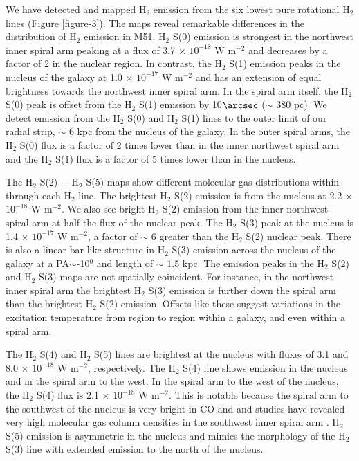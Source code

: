 \documentclass[12pt,preprint]{aastex}
\begin{document}
We have detected and mapped H$_2$ emission from the six
lowest pure rotational H$_2$ lines (Figure \ref{figure-3}).  The
maps reveal remarkable differences in the distribution of
H$_2$ emission in M51.  H$_2$ S(0) emission is
strongest in the northwest inner spiral arm peaking at a flux of 3.7
$\times$ $\mathrm{10^{-18}}$ W $\mathrm{m^{-2}}$ and decreases by a
factor of 2 in the nuclear region.  In contrast, the H$_2$
S(1) emission peaks in the nucleus of the galaxy at
1.0 $\times$ $\mathrm{10^{-17}}$ W $\mathrm{m^{-2}}$ and has an
extension of equal brightness towards the northwest inner spiral arm.  In the
spiral arm itself, the H$_2$ S(0) peak is offset from the
H$_2$ S(1) emission by 10$\arcsec$ ($\sim$ 380 pc).  
We detect emission from the H$_2$ S(0) and 
H$_2$ S(1) lines to the outer limit of our radial 
strip,  $\sim$ 6 kpc from the nucleus of the galaxy.  In the outer spiral arms,
the H$_2$ S(0) flux is a factor of 2 times lower than in
the inner northwest spiral arm and the H$_2$ S(1) flux
is a factor of 5 times lower than in the nucleus.
 
The $\mathrm{ H_2}$ S(2) $-$ H$_2$ S(5) maps show different
molecular gas distributions within  through each
H$_2$ line.  The brightest H$_2$ S(2) emission is
from the nucleus at 2.2 $\times$ $\mathrm{10^{-18}}$ W
$\mathrm{m^{-2}}$.  We also see bright H$_2$ S(2) emission
from the inner northwest spiral arm at half the flux of the
nuclear peak.  The H$_2$ S(3) peak at the nucleus is 1.4
$\times$ $\mathrm{10^{-17}}$ W $\mathrm{m^{-2}}$, a factor of $\sim$ 6
greater than the H$_2$ S(2) nuclear peak.  There is also a
linear bar-like structure in H$_2$ S(3) emission across the
nucleus of the galaxy at a PA$\sim$-10$^0$ and length of $\sim$ 1.5 kpc. 
The emission peaks in the
H$_2$ S(2) and H$_2$ S(3) maps are not spatially
coincident.  For instance, in the northwest inner spiral arm the brightest
H$_2$ S(3) emission is further down the spiral arm than 
the brightest H$_2$ S(2) emission.  Offsets like
these suggest variations in the excitation temperature from 
region to region within a galaxy, and even within a spiral arm.

The H$_2$ S(4) and H$_2$ S(5) lines are brightest at
the nucleus with fluxes of 3.1 and 8.0 $\times$
$\mathrm{10^{-18}}$ W $\mathrm{m^{-2}}$, respectively.  The H$_2$
S(4) line shows emission in the nucleus and in the spiral arm to the
west.  In the spiral arm to the west of the nucleus, the
H$_2$ S(4) flux is 2.1 $\times$ $\mathrm{10^{-18}}$ W
$\mathrm{m^{-2}}$.  This is notable because the spiral arm to the
southwest of the nucleus is very bright in CO and and studies have
revealed very high molecular gas column densities in the southwest
inner spiral arm \citep{lor90, aal99}.  H$_2$ S(5) emission is
asymmetric in the nucleus and mimics the morphology of the
H$_2$ S(3) line with extended emission to the north of the
nucleus.
\end{document}
